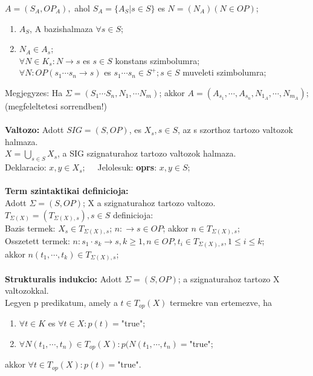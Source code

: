 \documentclass[a4paper,10pt]{article}
\begin{document}
$A=(S_A,OP_A),$ ahol $S_A=\lbrace A_S\vert s \in S\rbrace$ es $N=(N_A) (N \in OP)$;
\begin{enumerate}
\item $A_S$, A bazishalmaza $\forall s \in S$;
\item $N_A \in A_s$;\\
\indent $\forall N \in K_s: N\to s$ es $s \in S$ konstans szimbolumra;\\
\indent $\forall N: OP (s_1 \cdots s_n \to s)$ es $s_1 \cdots s_n \in S^+; s \in S$ muveleti szimbolumra;
\end{enumerate}
Megjegyzes: Ha $\Sigma=(S_1\cdots S_n, N_1, \cdots N_m)$; akkor $A=(A_{s_1}, \cdots, A_{s_n}, N_{1_A}, \cdots, N_{m_A})$; (megfeleltetesi sorrendben!)\\ \\
%
\textbf{Valtozo:} Adott $SIG=(S,OP)$, es $X_s, s \in S$, az s szorthoz tartozo valtozok halmaza.\\
$X=\bigcup_{s\in S}X_s$, a SIG szignaturahoz tartozo valtozok halmaza.\\
Deklaracio: $x, y \in X_s; \quad$ Jelolesuk: \textbf{oprs}: $x, y \in S$;\\ \\
%
\textbf{Term szintaktikai definicioja:}\\
Adott $\Sigma = (S, OP)$; X a szignaturahoz tartozo valtozo.\\
$T_{\Sigma(X)} = (T_{\Sigma(X),s}), s \in S$ definicioja:\\
Bazis termek: $X_s \in T_{\Sigma(X),s}$; $n:\to s \in OP$; akkor $n \in T_{\Sigma(X),s}$;\\
Osszetett termek: $n:s_1 \cdot s_k \to s, k\ge1, n \in OP, t_i \in T_{\Sigma(X),s}, 1\le i\le k$;\\
akkor $n(t_1, \cdots, t_k) \in T_{\Sigma(X),s}$;\\ \\
%
\textbf{Strukturalis indukcio:} Adott $\Sigma = (S,OP)$; a szignaturahoz tartozo X valtozokkal.\\
Legyen p predikatum, amely a $t \in T_{op}(X)$ termekre van ertemezve, ha
\begin{enumerate}
\item $\forall t \in K$ es $\forall t \in X: p(t)=$"true";
\item $\forall N(t_1, \cdots, t_n) \in T_{op}(X):p(N(t_1, \cdots, t_n)=$"true";
\end{enumerate}
akkor $\forall t \in T_{op}(X):p(t)=$"true".\\ \\
\end{document}
